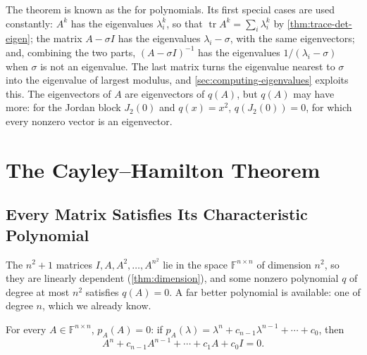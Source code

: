 The theorem is known as the  for polynomials. Its first special cases are used constantly: $A^k$ has the eigenvalues $\lambda_i^k$, so that $\operatorname{tr}A^k=\sum_i\lambda_i^k$ by \cref{thm:trace-det-eigen}; the  matrix $A-\sigma I$ has the eigenvalues $\lambda_i-\sigma$, with the same eigenvectors; and, combining the two parts, $(A-\sigma I)^{-1}$ has the eigenvalues $1/(\lambda_i-\sigma)$ when $\sigma$ is not an eigenvalue. The last matrix turns the eigenvalue nearest to $\sigma$ into the eigenvalue of largest modulus, and \cref{sec:computing-eigenvalues} exploits this. The eigenvectors of $A$ are eigenvectors of $q(A)$, but $q(A)$ may have more: for the Jordan block $J_2(0)$ and $q(x)=x^2$, $q(J_2(0))=0$, for which every nonzero vector is an eigenvector.

\section{The Cayley--Hamilton Theorem}
\label{sec:cayley-hamilton}

\subsection{Every Matrix Satisfies Its Characteristic Polynomial}

The $n^2+1$ matrices $I,A,A^2,\ldots,A^{n^2}$ lie in the space $\mathbb F^{n\times n}$ of dimension $n^2$, so they are linearly dependent (\cref{thm:dimension}), and some nonzero polynomial $q$ of degree at most $n^2$ satisfies $q(A)=0$. A far better polynomial is available: one of degree $n$, which we already know.

\begin{theorem}
\label{thm:cayley-hamilton}
For every $A\in\mathbb F^{n\times n}$, $p_A(A)=0$: if $p_A(\lambda)=\lambda^n+c_{n-1}\lambda^{n-1}+\cdots+c_0$, then
\[
A^n+c_{n-1}A^{n-1}+\cdots+c_1A+c_0I=0 .
\]
\end{theorem}

